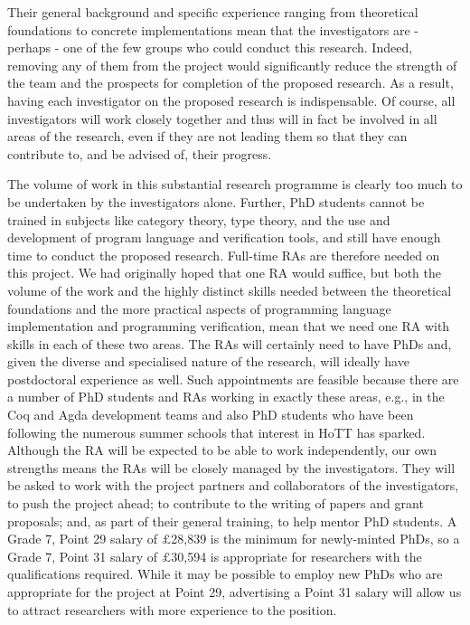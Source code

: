 \documentclass[a4paper,11pt]{article}
\begin{document}
Their general background and specific experience ranging from
theoretical foundations to concrete implementations mean that the
investigators are - perhaps - one of the few groups who could conduct
this research. Indeed, removing any of them from the project would
significantly reduce the strength of the team and the prospects for
completion of the proposed research. As a result, having each
investigator on the proposed research is indispensable. Of course, all
investigators will work closely together and thus will in fact be
involved in all areas of the research, even if they are not leading
them so that they can contribute to, and be advised of, their
progress.



\vspace{0.02in}

 The volume of work in this substantial
research programme is clearly too much to be undertaken by the
investigators alone. Further, PhD students cannot be trained in
subjects like category theory, type theory, and the use and
development of program language and verification tools, and still have
enough time to conduct the proposed research. Full-time RAs are
therefore needed on this project. We had originally hoped that one RA
would suffice, but both the volume of the work and the highly distinct
skills needed between the theoretical foundations and the more
practical aspects of programming language implementation and
programming verification, mean that we need one RA with skills in each
of these two areas.  The RAs will certainly need to have PhDs and,
given the diverse and specialised nature of the research, will ideally
have postdoctoral experience as well.  Such appointments are feasible
because there are a number of PhD students and RAs working in exactly
these areas, e.g., in the Coq and Agda development teams and also PhD
students who have been following the numerous summer schools that
interest in HoTT has sparked.  Although the RA will be expected to be
able to work independently, our own strengths means the RAs will be
closely managed by the investigators. They will be asked to work with
the project partners and collaborators of the investigators, to push the project ahead; to
contribute to the writing of papers and grant proposals; and, as part
of their general training, to help mentor PhD students. A Grade 7,
Point 29 salary of $\pounds$28,839 is the minimum for newly-minted
PhDs, so a Grade 7, Point 31 salary of $\pounds$30,594 is appropriate
for researchers with the qualifications required. While it may be
possible to employ new PhDs who are appropriate for the project at
Point 29, advertising a Point 31 salary will allow us to attract
researchers with more experience to the position. 
\end{document}
